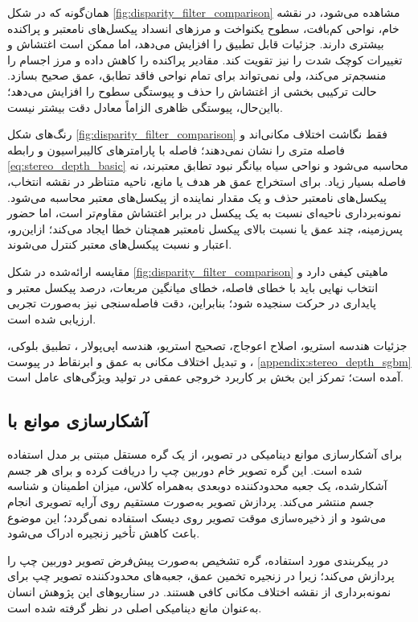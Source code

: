 همان‌گونه که در شکل \ref{fig:disparity_filter_comparison} مشاهده می‌شود، در نقشه خام، نواحی کم‌بافت، سطوح یکنواخت و مرزهای انسداد پیکسل‌های نامعتبر و پراکنده بیشتری دارند.  جزئیات قابل تطبیق را افزایش می‌دهد، اما ممکن است اغتشاش و تغییرات کوچک شدت را نیز تقویت کند.  مقادیر پراکنده را کاهش داده و مرز اجسام را منسجم‌تر می‌کند، ولی نمی‌تواند برای تمام نواحی فاقد تطابق، عمق صحیح بسازد. حالت ترکیبی بخشی از اغتشاش را حذف و پیوستگی سطوح را افزایش می‌دهد؛ بااین‌حال، پیوستگی ظاهری الزاماً معادل دقت بیشتر نیست.

رنگ‌های شکل \ref{fig:disparity_filter_comparison} فقط نگاشت اختلاف مکانی‌اند و فاصله متری را نشان نمی‌دهند؛ فاصله با پارامترهای کالیبراسیون و رابطه \ref{eq:stereo_depth_basic} محاسبه می‌شود و نواحی سیاه بیانگر نبود تطابق معتبرند، نه فاصله بسیار زیاد. برای استخراج عمق هر هدف یا مانع، ناحیه متناظر در نقشه انتخاب، پیکسل‌های نامعتبر حذف و یک مقدار نماینده از پیکسل‌های معتبر محاسبه می‌شود. نمونه‌برداری ناحیه‌ای نسبت به یک پیکسل در برابر اغتشاش مقاوم‌تر است، اما حضور پس‌زمینه، چند عمق یا نسبت بالای پیکسل نامعتبر همچنان خطا ایجاد می‌کند؛ ازاین‌رو، اعتبار و نسبت پیکسل‌های معتبر کنترل می‌شوند.

مقایسه ارائه‌شده در شکل \ref{fig:disparity_filter_comparison} ماهیتی کیفی دارد و انتخاب نهایی باید با خطای فاصله، خطای میانگین مربعات، درصد پیکسل معتبر و پایداری در حرکت سنجیده شود؛ بنابراین، دقت فاصله‌سنجی نیز به‌صورت تجربی ارزیابی شده است.

جزئیات هندسه استریو، اصلاح اعوجاج، تصحیح استریو، هندسه اپی‌پولار
، تطبیق بلوکی، ،  و تبدیل اختلاف مکانی به عمق و ابرنقاط در پیوست \ref{appendix:stereo_depth_sgbm} آمده است؛ تمرکز این بخش بر کاربرد خروجی عمقی در تولید ویژگی‌های عامل است.%
\subsection{آشکارسازی موانع با }
\label{subsec:yolo_obstacle_detection}

برای آشکارسازی موانع دینامیکی در تصویر، از یک گره مستقل مبتنی بر مدل  استفاده شده است. این گره تصویر خام دوربین چپ را دریافت کرده و برای هر جسم آشکارشده، یک جعبه محدودکننده دوبعدی به‌همراه کلاس، میزان اطمینان و شناسه جسم منتشر می‌کند. پردازش تصویر به‌صورت مستقیم روی آرایه تصویری انجام می‌شود و از ذخیره‌سازی موقت تصویر روی دیسک استفاده نمی‌گردد؛ این موضوع باعث کاهش تأخیر زنجیره ادراک می‌شود.

در پیکربندی مورد استفاده، گره تشخیص به‌صورت پیش‌فرض تصویر دوربین چپ را پردازش می‌کند؛ زیرا در زنجیره تخمین عمق، جعبه‌های محدودکننده تصویر چپ برای نمونه‌برداری از نقشه اختلاف مکانی کافی هستند. 	در سناریوهای این پژوهش انسان به‌عنوان مانع دینامیکی اصلی در نظر گرفته شده است.

